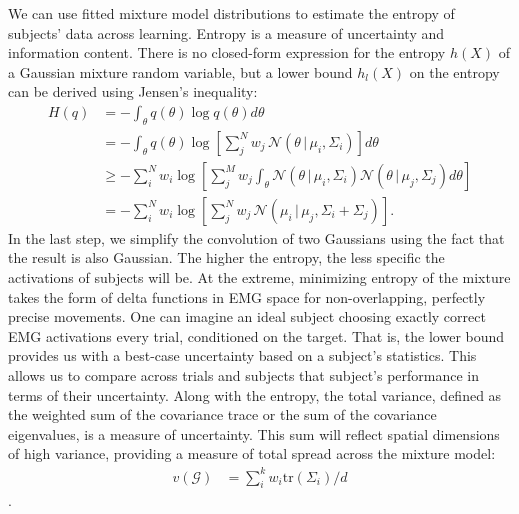 \documentclass[../main.tex]{subfiles}
\begin{document}
We can use fitted mixture model distributions to estimate the entropy of subjects' data across learning. Entropy is a measure of uncertainty and information content. There is no closed-form expression for the entropy $h(X)$ of a Gaussian mixture random variable, but a lower bound $h_l(X)$ on the entropy\cite{gershmanNonparametricVariationalInference,huberEntropyApproximationGaussian2008} can be derived using Jensen's inequality:
%
% 
\begin{align}
  H(q) &= - \int_\theta{q(\theta)\log{q(\theta)}d\theta} \\
       &= - \int_\theta{q(\theta)\log{\left\lbrack{\sum_j^N{w_j\,\mathcal{N}\left(\theta\,|\,\mu_i,\Sigma_i\right)}}\right\rbrack}d\theta} \\
       &\geq -\sum_{i}^{N}w_i\log\left\lbrack\sum_{j}^{M}{w_j\int_{\theta}\mathcal{N}\left(\theta\,|\,\mu_i,\Sigma_i\right)\mathcal{N}\left(\theta\,|\,\mu_j,\Sigma_j\right)d\theta}\right\rbrack \\ 
       &= -\sum_{i}^{N}w_i\log\left\lbrack\sum_{j}^{N}{w_j\,\mathcal{N}\left(\mu_i\,|\,\mu_j,\Sigma_i+\Sigma_j\right)}\right\rbrack.
\end{align}
%
In the last step, we simplify the convolution of two Gaussians using the fact that the result is also Gaussian. The higher the entropy, the less specific the activations of subjects will be. At the extreme, minimizing entropy of the mixture takes the form of delta functions in EMG space for non-overlapping, perfectly precise movements. One can imagine an ideal subject choosing exactly correct EMG activations every trial, conditioned on the target. That is, the lower bound provides us with a best-case uncertainty based on a subject's statistics. This allows us to compare across trials and subjects that subject's performance in terms of their uncertainty. Along with the entropy, the total variance, defined as the weighted sum of the covariance trace or the sum of the covariance eigenvalues, is a measure of uncertainty. This sum will reflect spatial dimensions of high variance, providing a measure of total spread across the mixture model:
%
\begin{align}
  v(\mathcal{G}) &=  \sum_i^k{w_i \mathrm{tr}(\Sigma_i)/d}
\end{align}\label{eq:mixture_metrics}.
%
\end{document}

